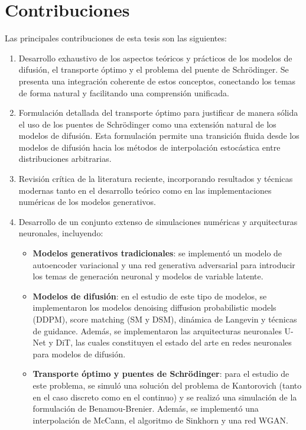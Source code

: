 \section*{Contribuciones}

Las principales contribuciones de esta tesis son las siguientes:

\begin{enumerate}
    \item Desarrollo exhaustivo de los aspectos teóricos y prácticos de los modelos de difusión, el transporte óptimo y el problema del puente de Schrödinger. Se presenta una integración coherente de estos conceptos, conectando los temas de forma natural y facilitando una comprensión unificada.
    \item Formulación detallada del transporte óptimo para justificar de manera sólida el uso de los puentes de Schrödinger como una extensión natural de los modelos de difusión. Esta formulación permite una transición fluida desde los modelos de difusión hacia los métodos de interpolación estocástica entre distribuciones arbitrarias.
    \item Revisión crítica de la literatura reciente, incorporando resultados y técnicas modernas tanto en el desarrollo teórico como en las implementaciones numéricas de los modelos generativos.
    \item Desarrollo de un conjunto extenso de simulaciones numéricas y arquitecturas neuronales, incluyendo:
          \begin{itemize}
              \item \textbf{Modelos generativos tradicionales}: se implementó un modelo de autoencoder variacional y una red generativa adversarial para introducir los temas de generación neuronal y modelos de variable latente.
              \item \textbf{Modelos de difusión}: en el estudio de este tipo de modelos, se implementaron los modelos denoising diffusion probabilistic models (DDPM), score matching (SM y DSM), dinámica de Langevin y técnicas de guidance. Además, se implementaron las arquitecturas neuronales U-Net y DiT, las cuales constituyen el estado del arte en redes neuronales para modelos de difusión.
              \item \textbf{Transporte óptimo y puentes de Schrödinger}: para el estudio de este problema, se simuló una solución del problema de Kantorovich (tanto en el caso discreto como en el continuo) y se realizó una simulación de la formulación de Benamou-Brenier. Además, se implementó una interpolación de McCann, el algoritmo de Sinkhorn y una red WGAN.
          \end{itemize}
\end{enumerate}

